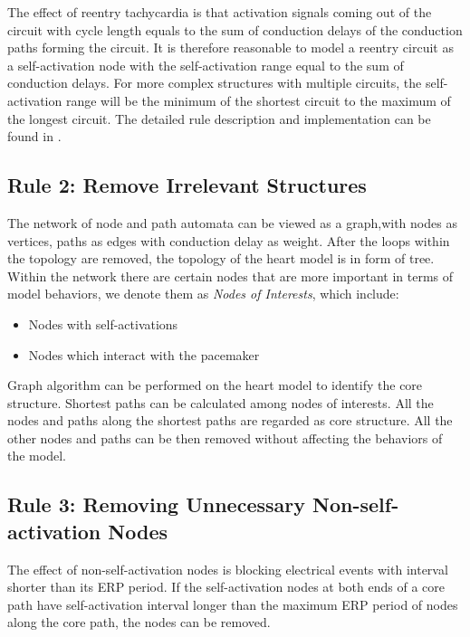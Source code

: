 The effect of reentry tachycardia is that activation signals coming out of the circuit with cycle length equals to the sum of conduction delays of the conduction paths forming the circuit. It is therefore reasonable to model a reentry circuit as a self-activation node with the self-activation range equal to the sum of conduction delays. For more complex structures with multiple circuits, the self-activation range will be the minimum of the shortest circuit to the maximum of the longest circuit. The detailed rule description and implementation can be found in \cite{regar_tech}.

\subsection{Rule 2: Remove Irrelevant Structures}
The network of node and path automata can be viewed as a graph,with nodes as vertices, paths as edges with conduction delay as weight. After the loops within the topology are removed, the topology of the heart model is in form of tree. Within the network there are certain nodes that are more important in terms of model behaviors, we denote them as \emph{Nodes of Interests}, which include:
\begin{itemize}
	\item Nodes with self-activations
	\item Nodes which interact with the pacemaker
\end{itemize}
Graph algorithm can be performed on the heart model to identify the core structure. Shortest paths can be calculated among nodes of interests. All the nodes and paths along the shortest paths are regarded as core structure. All the other nodes and paths can be then removed without affecting the behaviors of the model. 
\subsection{Rule 3: Removing Unnecessary Non-self-activation Nodes}
The effect of non-self-activation nodes is blocking electrical events with interval shorter than its ERP period. If the self-activation nodes at both ends of a core path have self-activation interval longer than the maximum ERP period of nodes along the core path, the nodes can be removed.

